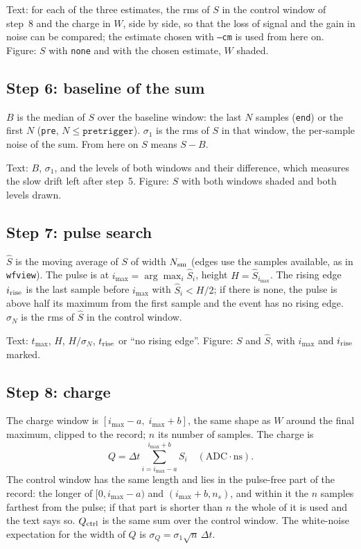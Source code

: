 \documentclass[11pt]{article}
\newcommand{\code}[1]{\texttt{#1}}
\begin{document}
Text: for each of the three estimates, the rms of $S$ in the control
window of step~8 and the charge in $W$, side by side, so that the loss of
signal and the gain in noise can be compared; the estimate chosen with
\code{--cm} is used from here on. Figure: $S$ with \code{none} and with
the chosen estimate, $W$ shaded.

\subsection{Step 6: baseline of the sum}

$B$ is the median of $S$ over the baseline window: the last $N$ samples
(\code{end}) or the first $N$ (\code{pre}, $N \le \code{pretrigger}$).
$\sigma_1$ is the rms of $S$ in that window, the per-sample noise of the
sum. From here on $S$ means $S - B$.

Text: $B$, $\sigma_1$, and the levels of both windows and their
difference, which measures the slow drift left after step~5. Figure: $S$
with both windows shaded and both levels drawn.

\subsection{Step 7: pulse search}

$\hat S$ is the moving average of $S$ of width $N_{\rm sm}$ (edges use the
samples available, as in \code{wfview}). The pulse is at $i_{\max} =
\arg\max_i \hat S_i$, height $H = \hat S_{i_{\max}}$. The rising edge
$i_{\rm rise}$ is the last sample before $i_{\max}$ with $\hat S_i < H/2$;
if there is none, the pulse is above half its maximum from the first
sample and the event has no rising edge. $\sigma_N$ is the rms of $\hat S$
in the control window.

Text: $t_{\max}$, $H$, $H/\sigma_N$, $t_{\rm rise}$ or ``no rising edge''.
Figure: $S$ and $\hat S$, with $i_{\max}$ and $i_{\rm rise}$ marked.

\subsection{Step 8: charge}

The charge window is $[i_{\max} - a,\; i_{\max} + b]$, the same shape as
$W$ around the final maximum, clipped to the record; $n$ its number of
samples. The charge is
\[
  Q = \Delta t \sum_{i = i_{\max}-a}^{i_{\max}+b} S_i \quad (\text{ADC}\cdot\text{ns}).
\]
The control window has the same length and lies in the pulse-free part of
the record: the longer of $[0, i_{\max}-a)$ and $(i_{\max}+b, n_s)$, and
within it the $n$ samples farthest from the pulse; if that part is shorter
than $n$ the whole of it is used and the text says so. $Q_{\rm ctrl}$ is
the same sum over the control window. The white-noise expectation for the
width of $Q$ is $\sigma_Q = \sigma_1 \sqrt{n}\,\Delta t$.
\end{document}
